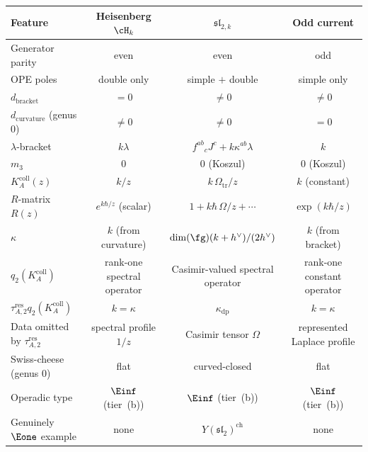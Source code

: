 \begin{center}
\small
\renewcommand{\arraystretch}{1.3}
\begin{tabular}{l|c|c|c}
\textbf{Feature}
 & \textbf{Heisenberg $\cH_k$}
 & $\widehat{\mathfrak{sl}}_{2,k}$
 & \textbf{Odd current} \\
\hline
Generator parity
 & even
 & even
 & odd \\
OPE poles
 & double only
 & simple $+$ double
 & simple only \\
$d_{\mathrm{bracket}}$
 & $= 0$
 & $\neq 0$
 & $\neq 0$ \\
$d_{\mathrm{curvature}}$ (genus $0$)
 & $\neq 0$
 & $\neq 0$
 & $= 0$ \\
$\lambda$-bracket
 & $k\lambda$
 & $f^{ab}{}_c J^c + k\kappa^{ab}\lambda$
 & $k$ \\
$m_3$
 & $0$
 & $0$ (Koszul)
 & $0$ (Koszul) \\
$K_A^{\mathrm{coll}}(z)$
 & $k/z$
 & $k\,\Omega_{\mathrm{tr}}/z$
 & $k$ (constant)\footnotemark \\
$R$-matrix $R(z)$
 & $e^{k\hbar/z}$ (scalar)
 & $1 + k\hbar\,\Omega/z + \cdots$
 & $\exp(k\hbar/z)$\footnotemark[\value{footnote}] \\
$\kappa$
 & $k$ (from curvature)
 & $\dim(\fg)(k+h^\vee)/(2h^\vee)$
 & $k$ (from bracket) \\
$q_2(K_A^{\mathrm{coll}})$
 & rank-one spectral operator
 & Casimir-valued spectral operator
 & rank-one constant operator \\
$\tau_{A,2}^{\mathrm{res}}q_2(K_A^{\mathrm{coll}})$
 & $k=\kappa$
 & $\kappa_{\mathrm{dp}}$
 & $k=\kappa$ \\
Data omitted by $\tau_{A,2}^{\mathrm{res}}$
 & spectral profile $1/z$
 & Casimir tensor $\Omega$
 & represented Laplace profile \\
Swiss-cheese (genus $0$)
 & flat
 & curved-closed
 & flat \\
Operadic type
 & $\Einf$ (tier~(b))
 & $\Einf$ (tier~(b))
 & $\Einf$ (tier~(b)) \\
Genuinely $\Eone$ example
 & none
 & $Y(\mathfrak{sl}_2)^{\mathrm{ch}}$
 & none \\
\end{tabular}
\end{center}



